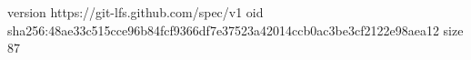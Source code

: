 version https://git-lfs.github.com/spec/v1
oid sha256:48ae33c515cce96b84fcf9366df7e37523a42014ccb0ac3be3cf2122e98aea12
size 87
